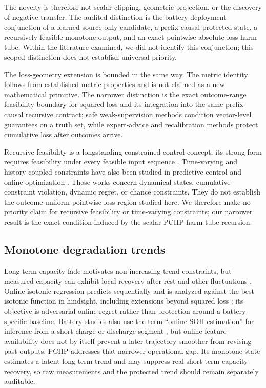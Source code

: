 \documentclass[11pt]{article}
\begin{document}
The novelty is therefore not scalar clipping, geometric projection, or the discovery of negative transfer. The audited distinction is the battery-deployment conjunction of a learned source-only candidate, a prefix-causal protected state, a recursively feasible monotone output, and an exact pointwise absolute-loss harm tube. Within the literature examined, we did not identify this conjunction; this scoped distinction does not establish universal priority.

The loss-geometry extension is bounded in the same way. The metric identity follows from established metric properties and is not claimed as a new mathematical primitive. The narrower distinction is the exact outcome-range feasibility boundary for squared loss and its integration into the same prefix-causal recursive contract; safe weak-supervision methods condition vector-level guarantees on a truth set, while expert-advice and recalibration methods protect cumulative loss after outcomes arrive.

Recursive feasibility is a longstanding constrained-control concept; its strong form requires feasibility under every feasible input sequence \citep{lofberg2012oops}. Time-varying and history-coupled constraints have also been studied in predictive control and online optimization \citep{li2021information,garber2024projectionfree,knaup2026recursively}. Those works concern dynamical states, cumulative constraint violation, dynamic regret, or chance constraints. They do not establish the outcome-uniform pointwise loss region studied here. We therefore make no priority claim for recursive feasibility or time-varying constraints; our narrower result is the exact condition induced by the scalar PCHP harm-tube recursion.

\subsection{Monotone degradation trends}

Long-term capacity fade motivates non-increasing trend constraints, but measured capacity can exhibit local recovery after rest and other fluctuations \citep{ma2021regeneration}. Online isotonic regression predicts sequentially and is analyzed against the best isotonic function in hindsight, including extensions beyond squared loss \citep{kotlowski2016online}; its objective is adversarial online regret rather than protection around a battery-specific baseline. Battery studies also use the term ``online SOH estimation'' for inference from a short charge or discharge segment \citep{liu2020online}, but online feature availability does not by itself prevent a later trajectory smoother from revising past outputs. PCHP addresses that narrower operational gap. Its monotone state estimates a latent long-term trend and may suppress real short-term capacity recovery, so raw measurements and the protected trend should remain separately auditable.
\end{document}
